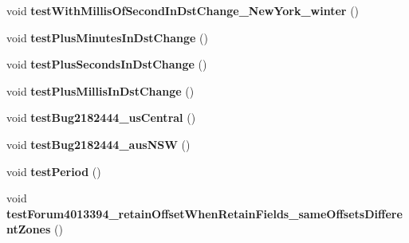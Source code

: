 \begin{DoxyCompactItemize}
\item 
\hypertarget{classorg_1_1joda_1_1time_1_1_test_date_time_zone_cutover_a66bf5d34c0c39fb999e5e9ef62a46985}{void {\bfseries test\-With\-Millis\-Of\-Second\-In\-Dst\-Change\-\_\-\-New\-York\-\_\-winter} ()}\label{classorg_1_1joda_1_1time_1_1_test_date_time_zone_cutover_a66bf5d34c0c39fb999e5e9ef62a46985}

\item 
\hypertarget{classorg_1_1joda_1_1time_1_1_test_date_time_zone_cutover_a578d3b33f06f8acbd43ec0e50df38e4c}{void {\bfseries test\-Plus\-Minutes\-In\-Dst\-Change} ()}\label{classorg_1_1joda_1_1time_1_1_test_date_time_zone_cutover_a578d3b33f06f8acbd43ec0e50df38e4c}

\item 
\hypertarget{classorg_1_1joda_1_1time_1_1_test_date_time_zone_cutover_a687700a89e865ca7fdee9df9d81d4fce}{void {\bfseries test\-Plus\-Seconds\-In\-Dst\-Change} ()}\label{classorg_1_1joda_1_1time_1_1_test_date_time_zone_cutover_a687700a89e865ca7fdee9df9d81d4fce}

\item 
\hypertarget{classorg_1_1joda_1_1time_1_1_test_date_time_zone_cutover_a341608d4c3156552761b7af27b794d49}{void {\bfseries test\-Plus\-Millis\-In\-Dst\-Change} ()}\label{classorg_1_1joda_1_1time_1_1_test_date_time_zone_cutover_a341608d4c3156552761b7af27b794d49}

\item 
\hypertarget{classorg_1_1joda_1_1time_1_1_test_date_time_zone_cutover_ae23001b4facff457f4881d24f81655f8}{void {\bfseries test\-Bug2182444\-\_\-us\-Central} ()}\label{classorg_1_1joda_1_1time_1_1_test_date_time_zone_cutover_ae23001b4facff457f4881d24f81655f8}

\item 
\hypertarget{classorg_1_1joda_1_1time_1_1_test_date_time_zone_cutover_a123999694380dfb045ea34b189806e11}{void {\bfseries test\-Bug2182444\-\_\-aus\-N\-S\-W} ()}\label{classorg_1_1joda_1_1time_1_1_test_date_time_zone_cutover_a123999694380dfb045ea34b189806e11}

\item 
\hypertarget{classorg_1_1joda_1_1time_1_1_test_date_time_zone_cutover_a4ca4f9188586b1899e869d72820a8442}{void {\bfseries test\-Period} ()}\label{classorg_1_1joda_1_1time_1_1_test_date_time_zone_cutover_a4ca4f9188586b1899e869d72820a8442}

\item 
\hypertarget{classorg_1_1joda_1_1time_1_1_test_date_time_zone_cutover_a51cab02f0e17258d7aa2ec156072ede6}{void {\bfseries test\-Forum4013394\-\_\-retain\-Offset\-When\-Retain\-Fields\-\_\-same\-Offsets\-Different\-Zones} ()}\label{classorg_1_1joda_1_1time_1_1_test_date_time_zone_cutover_a51cab02f0e17258d7aa2ec156072ede6}


\end{DoxyCompactItemize}
